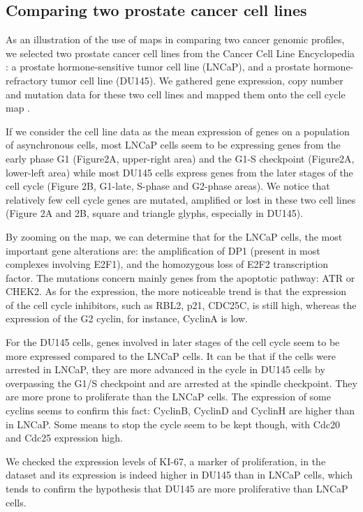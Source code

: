 \documentclass[a4,center,fleqn]{NAR}
\begin{document}
\subsection{Comparing two prostate cancer cell lines}

As an illustration of the use of maps in comparing two cancer genomic profiles, we
selected two prostate cancer cell lines from the Cancer Cell Line Encyclopedia
\cite{barretina2012cancer}: a prostate hormone-sensitive
tumor cell line (LNCaP), and a prostate hormone-refractory tumor cell line
(DU145). We gathered gene expression, copy number and mutation data for
these two cell lines and mapped them onto the cell cycle map
\cite{calzone2008comprehensive}.

If we consider the cell line data as the mean expression of genes on a
population of asynchronous cells, most LNCaP cells seem to be expressing genes
from the early phase G1 (Figure2A, upper-right area) and the G1-S checkpoint
(Figure2A, lower-left area) while most DU145 cells express genes from the
later stages of the cell cycle (Figure 2B, G1-late, S-phase and G2-phase
areas).  We notice that relatively few cell cycle genes are mutated, amplified or lost
in these two cell lines (Figure 2A and 2B, square and triangle glyphs, especially in DU145).

By zooming on the map, we can determine that for the LNCaP cells, the most
important gene alterations are: the amplification of DP1 (present in most
complexes involving E2F1), and the homozygous loss of E2F2 transcription
factor. The mutations concern mainly genes from the apoptotic pathway: ATR or
CHEK2. As for the expression, the more noticeable trend is that the expression
of the cell cycle inhibitors, such as RBL2, p21, CDC25C, is still high, whereas
the expression of the G2 cyclin, for instance, CyclinA is low.

For the DU145 cells, genes involved in later stages of the cell cycle seem to
be more expressed compared to the LNCaP cells. It can be that if the cells were
arrested in LNCaP, they are more advanced in the cycle in DU145 cells by
overpassing the G1/S checkpoint and are arrested at the spindle checkpoint.
They are more prone to proliferate than the LNCaP cells. The expression of some
cyclins seems to confirm this fact: CyclinB, CyclinD and CyclinH are higher
than in LNCaP. Some means to stop the cycle seem to be kept though, with Cdc20
and Cdc25 expression high.

We checked the expression levels of KI-67, a marker of proliferation, in the
dataset and its expression is indeed higher in DU145 than in LNCaP cells, which
tends to confirm the hypothesis that DU145 are more proliferative than LNCaP
cells.
\end{document}
